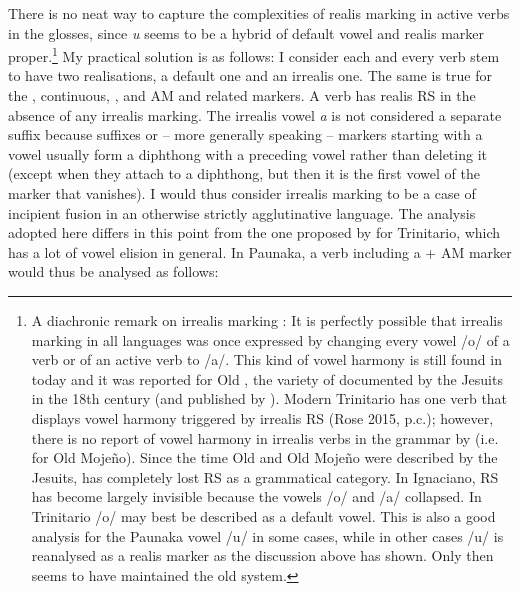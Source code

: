There is no neat way to capture the complexities of realis marking in active verbs in the glosses, since \textit{u} seems to be a hybrid of default vowel and realis marker proper.\footnote{\label{fn:VowelHarmony}A diachronic remark on irrealis marking \citep[cf. also][102--103]{DanielsenTerhartSubm}: It is perfectly possible that irrealis marking in all  languages was once expressed by changing every vowel /o/ of a verb or of an active verb to /a/. This kind of vowel harmony is still found in  today \citep[35]{ButlerEkdahl2012} and it was reported for Old , the variety of  documented by the Jesuits in the 18th century (and published by \citealt{AdamLeclerc1880}). Modern Trinitario has one verb that displays vowel harmony triggered by irrealis RS (Rose 2015, p.c.); however, there is no report of vowel harmony in irrealis verbs in the grammar by \citet[]{Marban1894} (i.e. for Old Mojeño). Since the time Old  and Old Mojeño were described by the Jesuits,  has completely lost RS as a grammatical category. In Ignaciano, RS has become largely invisible because the vowels /o/ and /a/ collapsed. In Trinitario /o/ may best be described as a default vowel. This is also a good analysis for the Paunaka vowel /u/ in some cases, while in other cases /u/ is reanalysed as a realis marker as the discussion above has shown. Only  then seems to have maintained the old system.} My practical solution is as follows: I consider each and every verb stem to have two realisations, a default one and an irrealis one. The same is true for the , continuous, , and AM and related markers. A verb has realis RS in the absence of any irrealis marking. The irrealis vowel \textit{a} is not considered a separate suffix because suffixes or – more generally speaking – markers starting with a vowel usually form a diphthong with a preceding vowel rather than deleting it (except when they attach to a diphthong, but then it is the first vowel of the marker that vanishes). I would thus consider irrealis marking to be a case of incipient fusion in an otherwise strictly agglutinative language. The analysis adopted here differs in this point from the one proposed by \citet[227]{Rose2014} for Trinitario, which has a lot of vowel elision in general. In Paunaka, a verb including a  + AM marker would thus be analysed as follows:

